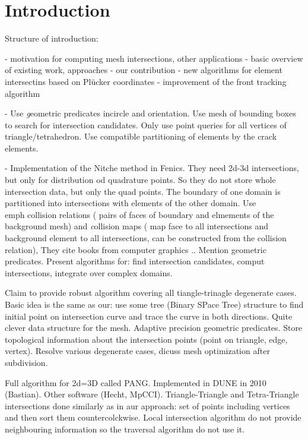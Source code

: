 \documentclass{elsarticle}
\begin{document}

\section{Introduction}
Structure of introduction:

- motivation for computing mesh intersections, other applications
- basic overview of existing work, approaches
- our contribution
    - new algorithms for element intersectins based on Pl\"ucker coordinates
    - improvement of the front tracking algorithm

\cite{sukumar_extended_2000} - Use {\emph geometric predicates} incircle and orientation. Use mesh of bounding boxes to search for intersection candidates. 
Only use point queries for all vertices of triangle/tetrahedron. Use compatible partitioning of elements by the crack elements.

\cite{massing_efficient_2013} - Implementation of the Nitche method in Fenics. They need 2d-3d intersections, but only for distribution od quadrature points. 
So they do not store whole intersection data, but only the quad points. The boundary of one domain is partitioned into intersections with elements of the other domain.
Use {\\emph collision relations} ( pairs of faces of boundary and elmements of the background mesh) and {\emph collision maps} 
( map face to all intersections and background element to all intersections, can be constructed from the collision relation), They cite books from computer graphics ..
Mention geometric predicates. Present algorithms for:  find intersection candidates, comput intersections, integrate over complex domains.

\cite{elsheikh_reliable_2012} Claim to provide robust algorithm covering all tiangle-trinagle degenerate cases. Basic idea is the same as our: use some tree 
(Binary SPace Tree) structure to find initial point on intersection curve and trace the curve in both directions. Quite clever data structure for the mesh. Adaptive precision 
geometric predicates. Store topological information about the intersection points (point on triangle, edge, vertex). Resolve various degenerate cases, 
dicuss mesh optimization after subdivision.


\cite{gander_algorithm_2013} Full algorithm for 2d=3D called PANG. Implemented in DUNE in 2010 (Bastian). Other software (Hecht, MpCCI). 
Triangle-Triangle and Tetra-Triangle intersections done similarly as in aur approach: set of points including vertices and then sort them countercolckwise.
Local intersection algorithm do not provide neighbouring information so the traversal algorithm do not use it.
\end{document}
